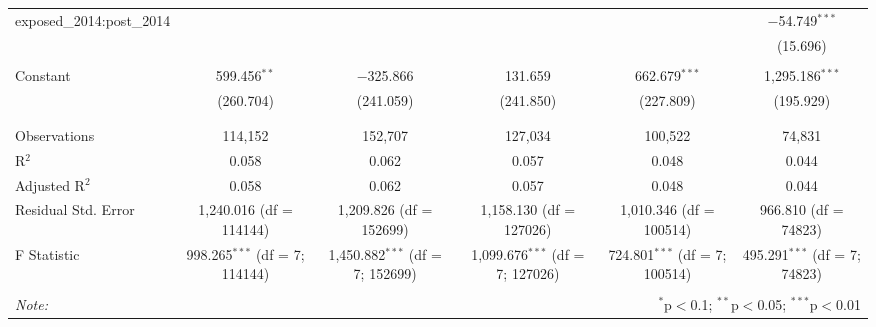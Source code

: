 \begin{table}[!htbp]
\begin{adjustbox}{width=\textwidth}
\begin{tabular}{@{\extracolsep{5pt}}lccccc}
 exposed\_2014:post\_2014 &  &  &  &  & $-$54.749$^{***}$ \\ 
  &  &  &  &  & (15.696) \\ 
  & & & & & \\ 
 Constant & 599.456$^{**}$ & $-$325.866 & 131.659 & 662.679$^{***}$ & 1,295.186$^{***}$ \\ 
  & (260.704) & (241.059) & (241.850) & (227.809) & (195.929) \\ 
  & & & & & \\ 
\hline \\[-1.8ex] 
Observations & 114,152 & 152,707 & 127,034 & 100,522 & 74,831 \\ 
R$^{2}$ & 0.058 & 0.062 & 0.057 & 0.048 & 0.044 \\ 
Adjusted R$^{2}$ & 0.058 & 0.062 & 0.057 & 0.048 & 0.044 \\ 
Residual Std. Error & 1,240.016 (df = 114144) & 1,209.826 (df = 152699) & 1,158.130 (df = 127026) & 1,010.346 (df = 100514) & 966.810 (df = 74823) \\ 
F Statistic & 998.265$^{***}$ (df = 7; 114144) & 1,450.882$^{***}$ (df = 7; 152699) & 1,099.676$^{***}$ (df = 7; 127026) & 724.801$^{***}$ (df = 7; 100514) & 495.291$^{***}$ (df = 7; 74823) \\ 
\hline 
\hline \\[-1.8ex] 
\textit{Note:}  & \multicolumn{5}{r}{$^{*}$p$<$0.1; $^{**}$p$<$0.05; $^{***}$p$<$0.01} \\ 
\end{tabular} 
\end{adjustbox}
\end{table} 
